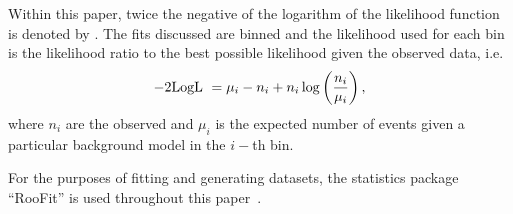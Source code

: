 Within this paper, twice the negative of the logarithm of the likelihood
function is denoted by \nll. The fits discussed are binned and the 
likelihood used for each bin is the likelihood ratio to the best
possible likelihood given the observed data, i.e.
\begin{equation}
{\rm \nll} = \mu_i - n_i + n_i \log\left(\frac{n_i}{\mu_i}\right),
\label{eqn:introduction:def2NLL}
\end{equation}
where $n_{i}$ are the observed and $\mu_{i}$ is the expected number of events 
given a particular background model in the $i-$th bin. 

For the purposes of fitting and generating datasets, the statistics package 
``RooFit'' is used throughout this paper~\cite{ref:roofit}. 
